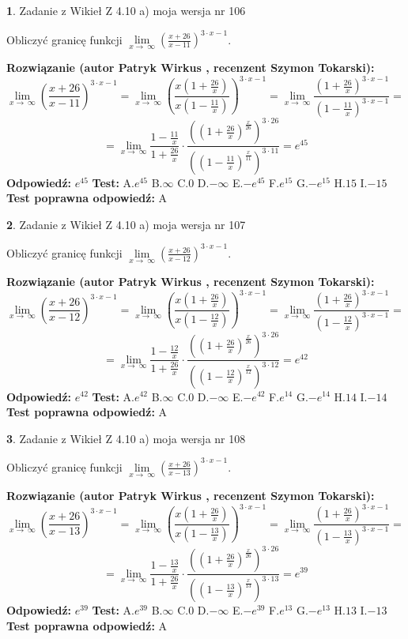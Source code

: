\documentclass[12pt, a4paper]{article}
\theoremstyle{definition} %
\newtheorem{zad}{}
\newcommand{\zadStart}[1]{\begin{zad}#1\newline}
\newcommand{\zadStop}{\end{zad}}
\newcommand{\rozwStart}[2]{\noindent \textbf{Rozwiązanie (autor #1 , recenzent #2): }\newline}
\newcommand{\rozwStop}{\newline}
\newcommand{\odpStart}{\noindent \textbf{Odpowiedź:}\newline}
\newcommand{\odpStop}{\newline}
\newcommand{\testStart}{\noindent \textbf{Test:}\newline}
\newcommand{\testStop}{\newline}
\newcommand{\kluczStart}{\noindent \textbf{Test poprawna odpowiedź:}\newline}
\newcommand{\kluczStop}{\newline}
\begin{document}
\zadStart{Zadanie z Wikieł Z 4.10 a) moja wersja nr 106}

Obliczyć granicę funkcji  $\lim\limits_{x\to\ \infty}(\frac{x+26}{x-11})^{3\cdot x-1}$.
\zadStop
\rozwStart{Patryk Wirkus}{Szymon Tokarski}
$$\lim\limits_{x\to\ \infty}(\frac{x+26}{x-11})^{3\cdot x-1} = \lim\limits_{x\to\ \infty}(\frac{x(1+\frac{26}{x})}{x(1-\frac{11}{x})})^{3\cdot x-1}=\lim\limits_{x\to\ \infty}\frac{(1+\frac{26}{x})^{3\cdot x-1}}{(1-\frac{11}{x})^{3\cdot x-1}}=$$
$$=\lim\limits_{x\to\ \infty}\frac{1-\frac{11}{x}}{1+\frac{26}{x}}\cdot\frac{((1+\frac{26}{x})^{\frac{x}{26}})^{3\cdot26}}{((1-\frac{11}{x})^{\frac{x}{11}})^{3\cdot11}}=e^{45}$$
\rozwStop
\odpStart
$e^{45}$
\odpStop
\testStart
A.$e^{45}$ B.$\infty$ C.$0$ D.$-\infty$ E.$-e^{45}$
F.$e^{15}$ G.$-e^{15}$
H.$15$
I.$-15$
\testStop
\kluczStart
A
\kluczStop



\zadStart{Zadanie z Wikieł Z 4.10 a) moja wersja nr 107}

Obliczyć granicę funkcji  $\lim\limits_{x\to\ \infty}(\frac{x+26}{x-12})^{3\cdot x-1}$.
\zadStop
\rozwStart{Patryk Wirkus}{Szymon Tokarski}
$$\lim\limits_{x\to\ \infty}(\frac{x+26}{x-12})^{3\cdot x-1} = \lim\limits_{x\to\ \infty}(\frac{x(1+\frac{26}{x})}{x(1-\frac{12}{x})})^{3\cdot x-1}=\lim\limits_{x\to\ \infty}\frac{(1+\frac{26}{x})^{3\cdot x-1}}{(1-\frac{12}{x})^{3\cdot x-1}}=$$
$$=\lim\limits_{x\to\ \infty}\frac{1-\frac{12}{x}}{1+\frac{26}{x}}\cdot\frac{((1+\frac{26}{x})^{\frac{x}{26}})^{3\cdot26}}{((1-\frac{12}{x})^{\frac{x}{12}})^{3\cdot12}}=e^{42}$$
\rozwStop
\odpStart
$e^{42}$
\odpStop
\testStart
A.$e^{42}$ B.$\infty$ C.$0$ D.$-\infty$ E.$-e^{42}$
F.$e^{14}$ G.$-e^{14}$
H.$14$
I.$-14$
\testStop
\kluczStart
A
\kluczStop



\zadStart{Zadanie z Wikieł Z 4.10 a) moja wersja nr 108}

Obliczyć granicę funkcji  $\lim\limits_{x\to\ \infty}(\frac{x+26}{x-13})^{3\cdot x-1}$.
\zadStop
\rozwStart{Patryk Wirkus}{Szymon Tokarski}
$$\lim\limits_{x\to\ \infty}(\frac{x+26}{x-13})^{3\cdot x-1} = \lim\limits_{x\to\ \infty}(\frac{x(1+\frac{26}{x})}{x(1-\frac{13}{x})})^{3\cdot x-1}=\lim\limits_{x\to\ \infty}\frac{(1+\frac{26}{x})^{3\cdot x-1}}{(1-\frac{13}{x})^{3\cdot x-1}}=$$
$$=\lim\limits_{x\to\ \infty}\frac{1-\frac{13}{x}}{1+\frac{26}{x}}\cdot\frac{((1+\frac{26}{x})^{\frac{x}{26}})^{3\cdot26}}{((1-\frac{13}{x})^{\frac{x}{13}})^{3\cdot13}}=e^{39}$$
\rozwStop
\odpStart
$e^{39}$
\odpStop
\testStart
A.$e^{39}$ B.$\infty$ C.$0$ D.$-\infty$ E.$-e^{39}$
F.$e^{13}$ G.$-e^{13}$
H.$13$
I.$-13$
\testStop
\kluczStart
A
\kluczStop
\end{document}
